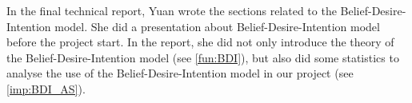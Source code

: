 In the final technical report, Yuan wrote the sections related to the Belief-Desire-Intention model.
She did a presentation about Belief-Desire-Intention model before the project start.
In the report, she did not only introduce the theory of the Belief-Desire-Intention model (see \autoref{fun:BDI}), but also did some statistics to analyse the use of the Belief-Desire-Intention model in our project (see \autoref{imp:BDI_AS}).
